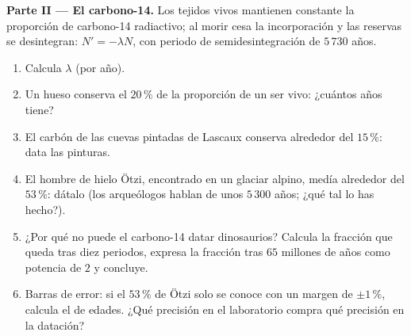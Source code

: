 \begin{problem}
\medskip
\noindent\textbf{Parte II --- El carbono-14.}
Los tejidos vivos mantienen constante la proporción de carbono-14
radiactivo; al morir cesa la incorporación y las reservas se desintegran:
$N' = -\lambda N$, con periodo de semidesintegración de $5\,730$ años.
\begin{enumerate}[resume]
  \item Calcula $\lambda$ (por año).
  \item Un hueso conserva el $20\,\%$ de la proporción de un ser vivo:
        ¿cuántos años tiene?
  \item El carbón de las cuevas pintadas de Lascaux conserva alrededor del
        $15\,\%$: data las pinturas.
  \item El hombre de hielo Ötzi, encontrado en un glaciar alpino, medía
        alrededor del $53\,\%$: dátalo (los arqueólogos hablan de unos
        $5\,300$ años; ¿qué tal lo has hecho?).
  \item ¿Por qué no puede el carbono-14 datar dinosaurios? Calcula la
        fracción que queda tras diez periodos, expresa la fracción tras
        $65$ millones de años como potencia de $2$ y concluye.
  \item Barras de error: si el $53\,\%$ de Ötzi solo se conoce con un
        margen de $\pm 1\,\%$, calcula el  de edades. ¿Qué
        precisión en el laboratorio compra qué precisión en la datación?
\end{enumerate}


\end{problem}
